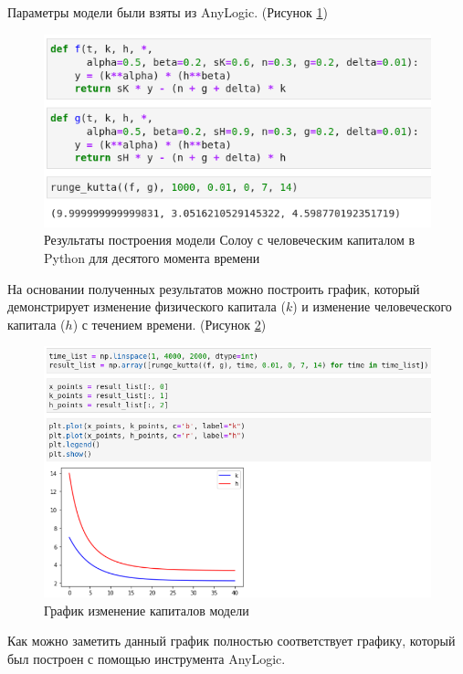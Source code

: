 \documentclass[14pt,fleqn]{extarticle}
\begin{document}
	Параметры модели были взяты из AnyLogic. (Рисунок \ref{fig:M-R-W_python_result})
	\begin{figure}[h]
		\centering \includegraphics[scale=0.5]{M-R-W_python_result}
		\caption{Результаты построения модели Солоу с человеческим капиталом в Python для десятого момента времени}
		\label{fig:M-R-W_python_result}
	\end{figure}
	
	\newpage
	
	На основании полученных результатов можно построить график, который демонстрирует изменение физического капитала ($k$) и изменение человеческого капитала ($h$) с течением времени. (Рисунок \ref{fig:M-R-W_python_result_plot})
	\begin{figure}[h]
		\centering \includegraphics[scale=0.4]{M-R-W_python_result_plot}
		\caption{График изменение капиталов модели}
		\label{fig:M-R-W_python_result_plot}
	\end{figure}
	
	Как можно заметить данный график полностью соответствует графику, который был построен с помощью инструмента AnyLogic.\\
	
\end{document}

